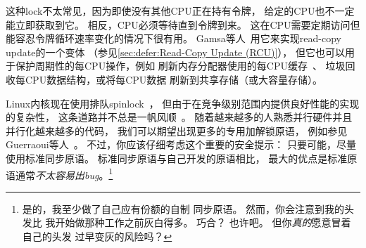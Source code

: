 
这种lock不太常见，因为即使没有其他CPU正在持有令牌，
给定的CPU也不一定能立即获取到它。
相反，CPU必须等待直到令牌到来。
这在CPU需要定期访问但能容忍令牌循环速率变化的情况下很有用。
Gamsa等人~\cite{Gamsa99}用它来实现read-copy update的一个变体
（参见\cref{sec:defer:Read-Copy Update (RCU)}），
但它也可以用于保护周期性的每CPU操作，例如
刷新内存分配器使用的每CPU缓存~\cite{McKenney93}、
垃圾回收每CPU数据结构，或将每CPU数据
刷新到共享存储（或大容量存储）。

Linux内核现在使用排队spinlock~\cite{JonathanCorbet2014qspinlocks}，
但由于在竞争级别范围内提供良好性能的实现的复杂性，
这条道路并不总是一帆风顺~\cite{CatalinMarinas2018qspinlockTLA,WillDeacon2018qspinlock}。
随着越来越多的人熟悉并行硬件并且并行化越来越多的代码，
我们可以期望出现更多的专用加解锁原语，
例如参见Guerraoui等人~\cite{Guerraoui:2019:LPA:3319851.3301501,HugoGuirouxPhD}。
不过，你应该仔细考虑这个重要的安全提示：
只要可能，尽量使用标准同步原语。
标准同步原语与自己开发的原语相比，
最大的优点是标准原语通常\emph{不太容易出bug}。\footnote{
	是的，我至少做了自己应有份额的自制
	同步原语。
	然而，你会注意到我的头发比
	我开始做那种工作之前灰白得多。
	巧合？
	也许吧。
	但你\emph{真的}愿意冒着自己的头发
	过早变灰的风险吗？}



